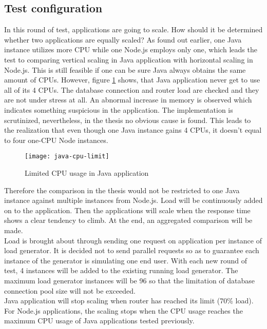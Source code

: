 \subsection{Test configuration}
 In this round of test, applications are going to scale. How should it be determined whether two applications are equally scaled? As found out earlier, one Java instance utilizes more CPU while one Node.js employs only one, which leads the test to comparing vertical scaling in Java application with horizontal scaling in Node.js. This is still feasible if one can be sure Java always obtains the same amount of CPUs. However, figure \ref{java-cpu-limit} shows, that Java application never get to use all of its 4 CPUs. The database connection and router load are checked and they are not under stress at all.  An abnormal increase in memory is observed which indicates something suspicious in the application. The implementation is scrutinized, nevertheless, in the thesis no obvious cause is found. This leads to the realization that even though one Java instance gains 4 CPUs, it doesn't equal to four one-CPU Node instances. 
 
 \begin{figure}[h]
 	\centering
 	\texttt{[image: java-cpu-limit]}
 	\caption{Limited CPU usage in Java application}
 	\label{java-cpu-limit}
 \end{figure}
Therefore the comparison in the thesis would not be restricted to one Java instance against multiple instances from Node.js. Load will be continuously added on to the application. Then the applications will scale when the response time shows a clear tendency to climb. At the end, an aggregated comparison will be made. \\
Load is brought about through sending one request on application per instance of load generator. It is decided not to send parallel requests so as to guarantee each instance of the generator is simulating one end user. With each new round of test, 4 instances will be added to the existing running load generator. The maximum load generator instances will be 96 so that the limitation of database connection pool size will not be exceeded.\\
Java application will stop scaling when router has reached its limit (70\% load). For Node.js applications, the scaling stops when the CPU usage reaches the maximum CPU usage of Java applications tested previously.
 
